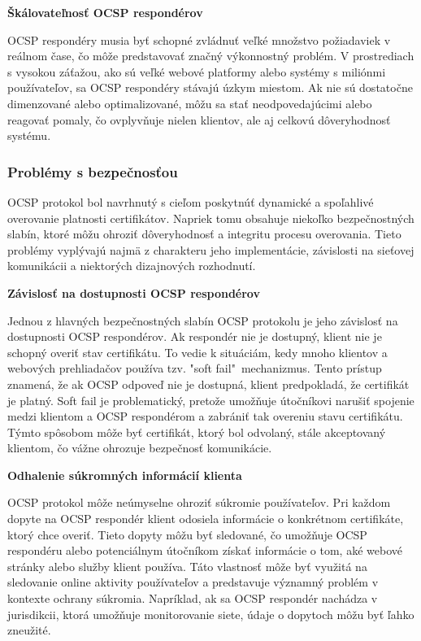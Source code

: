 \documentclass[12pt, twoside]{book}
\newcommand{\subsubsubsection}[1]{%
  \vspace{0.2em}  
  \textbf{#1} \\[0.2em]
  \hspace*{\parindent}
}
\begin{document}
\subsubsubsection{Škálovateľnosť OCSP respondérov}
OCSP respondéry musia byť schopné zvládnuť veľké množstvo požiadaviek v reálnom čase, čo môže predstavovať značný výkonnostný problém. V prostrediach s vysokou záťažou, ako sú veľké webové platformy alebo systémy s miliónmi používateľov, sa OCSP respondéry stávajú úzkym miestom. Ak nie sú dostatočne dimenzované alebo optimalizované, môžu sa stať neodpovedajúcimi alebo reagovať pomaly, čo ovplyvňuje nielen klientov, ale aj celkovú dôveryhodnosť systému.\cite{wazan, smith}

\subsubsection{Problémy s bezpečnosťou}
OCSP protokol bol navrhnutý s cieľom poskytnúť dynamické a spoľahlivé overovanie platnosti certifikátov. Napriek tomu obsahuje niekoľko bezpečnostných slabín, ktoré môžu ohroziť dôveryhodnosť a integritu procesu overovania. Tieto problémy vyplývajú najmä z charakteru jeho implementácie, závislosti na sieťovej komunikácii a niektorých dizajnových rozhodnutí.

\subsubsubsection{Závislosť na dostupnosti OCSP respondérov}
Jednou z hlavných bezpečnostných slabín OCSP protokolu je jeho závislosť na dostupnosti OCSP respondérov. Ak respondér nie je dostupný, klient nie je schopný overiť stav certifikátu. To vedie k situáciám, kedy mnoho klientov a webových prehliadačov používa tzv. "soft fail"\ mechanizmus. Tento prístup znamená, že ak OCSP odpoveď nie je dostupná, klient predpokladá, že certifikát je platný. Soft fail je problematický, pretože umožňuje útočníkovi narušiť spojenie medzi klientom a OCSP respondérom a zabrániť tak overeniu stavu certifikátu. Týmto spôsobom môže byť certifikát, ktorý bol odvolaný, stále akceptovaný klientom, čo vážne ohrozuje bezpečnosť komunikácie.\cite{security_pki}

\subsubsubsection{Odhalenie súkromných informácií klienta}
OCSP protokol môže neúmyselne ohroziť súkromie používateľov. Pri každom dopyte na OCSP respondér klient odosiela informácie o konkrétnom certifikáte, ktorý chce overiť. Tieto dopyty môžu byť sledované, čo umožňuje OCSP respondéru alebo potenciálnym útočníkom získať informácie o tom, aké webové stránky alebo služby klient používa. Táto vlastnosť môže byť využitá na sledovanie online aktivity používateľov a predstavuje významný problém v kontexte ochrany súkromia. Napríklad, ak sa OCSP respondér nachádza v jurisdikcii, ktorá umožňuje monitorovanie siete, údaje o dopytoch môžu byť ľahko zneužité.\cite{turin2}
\end{document}
